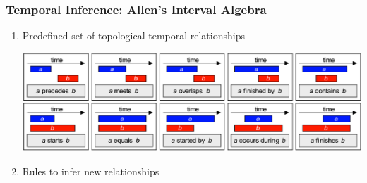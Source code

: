 \documentclass{beamer}
\begin{document}
\frame
{
  \frametitle{Temporal Inference: Allen's Interval Algebra}

  \begin{enumerate}

  \item<+-> Predefined set of topological temporal relationships
    \begin{center}
      \includegraphics[scale=0.21]{Allen_trunk.png}
    \end{center}

  \item<+-> Rules to infer new relationships
\end{enumerate}}
\end{document}
